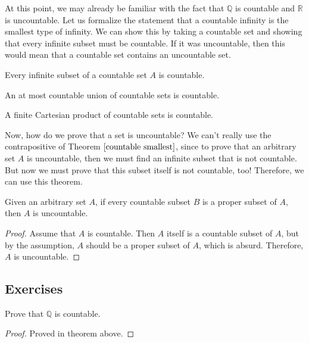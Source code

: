   At this point, we may already be familiar with the fact that $\mathbb{Q}$ is countable and $\mathbb{R}$ is uncountable. Let us formalize the statement that a countable infinity is the smallest type of infinity. We can show this by taking a countable set and showing that every infinite subset must be countable. If it was uncountable, then this would mean that a countable set contains an uncountable set. 

  \begin{theorem}
    \label{countable smallest}
    Every infinite subset of a countable set $A$ is countable. 
  \end{theorem}

  \begin{theorem}
    An at most countable union of countable sets is countable. 
  \end{theorem}

  \begin{theorem}
    A finite Cartesian product of countable sets is countable. 
  \end{theorem}

  Now, how do we prove that a set is uncountable? We can't really use the contrapositive of Theorem $\ref{countable smallest}$, since to prove that an arbitrary set $A$ is uncountable, then we must find an infinite subset that is not countable. But now we must prove that this subset itself is not countable, too! Therefore, we can use this theorem. 

  \begin{theorem}
    Given an arbitrary set $A$, if every countable subset $B$ is a proper subset of $A$, then $A$ is uncountable. 
  \end{theorem}
  \begin{proof}
    Assume that $A$ is countable. Then $A$ itself is a countable subset of $A$, but by the assumption, $A$ should be a proper subset of $A$, which is absurd. Therefore, $A$ is uncountable. 
  \end{proof}

\subsection{Exercises}

  \begin{exercise}
    Prove that $\mathbb{Q}$ is countable. 
  \end{exercise}
  \begin{proof}
    Proved in theorem above. 
  \end{proof}


